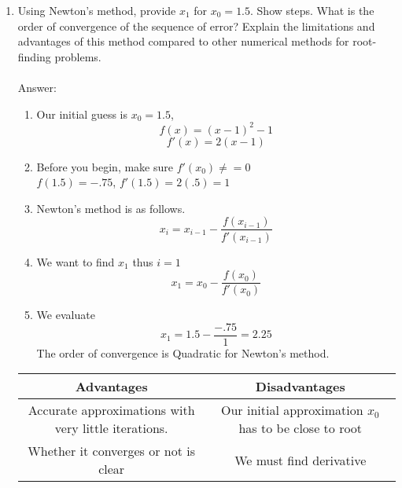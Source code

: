 \documentclass{article}
\begin{document}
\begin{enumerate}
\begin{enumerate}
        \color{black}
        \item Using Newton’s method, provide $x_1$ for $x_0 = 1.5$. Show steps. What is the order of convergence of the sequence of error? Explain the limitations and advantages of this method compared to other numerical methods for root-finding problems.\\
        \\
        \color{red}
            Answer:\\
           \begin{enumerate}
                \item Our initial guess is $x_0 = 1.5$, $$f(x) = (x -1)^2 - 1$$
                $$f'(x) = 2(x - 1)$$
                \item Before you begin, make sure $f'(x_0) \neq = 0$\\
                $f(1.5) = -.75$, $f'(1.5) = 2(.5) = 1$
                \item Newton's method is as follows. 
                $$x_i = x_{i - 1} - \frac{f(x_{i - 1})}{f'(x_{i - 1})}$$
                \item We want to find $x_1$ thus $i = 1$
                $$x_1 = x_{0} - \frac{f(x_{0})}{f'(x_{0})}$$
                \item We evaluate
                $$x_1 = 1.5 - \frac{-.75}{1} = 2.25$$
                The order of convergence is Quadratic for Newton's method.
            \end{enumerate}
            \begin{tabular}{c|c}
                 Advantages &  Disadvantages \\
                 \hline
            Accurate approximations with very little iterations.   &
            Our initial approximation $x_0$ 
            has to be close to root\\
            \hline
            Whether it converges or not is clear & We must find derivative
            \end{tabular}
        \color{black}
     \end{enumerate}
     

\end{enumerate}
\end{document}
